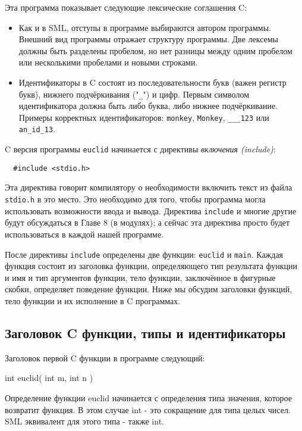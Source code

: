 Эта программа показывает следующие лексические соглашения C:

\begin{itemize}
\item{Как и в SML, отступы в программе выбираются автором программы. Внешний вид программы отражает структуру программы. Две лексемы должны быть разделены пробелом, но нет разницы между одним пробелом или несколькими пробелами и новыми строками.}

\item{\label{CIdentifiers}Идентификаторы в C состоят из последовательности букв (важен регистр букв), нижнего подчёркивания ("\lstinline|_|") и цифр. Первым символом идентификатора должна быть либо буква, либо нижнее подчёркивание. Примеры корректных идентификаторов: \lstinline|monkey|, \lstinline|Monkey|, \lstinline|___123| или \lstinline|an_id_13|.}
\end{itemize}

C версия программы \lstinline|euclid| начинается с директивы \emph{включения (include)}:

\begin{lstlisting}
  #include <stdio.h>
\end{lstlisting}

Эта директива говорит компилятору о необходимости включить текст из файла \lstinline|stdio.h| в это место. Это необходимо для того, чтобы программа могла использовать возможности ввода и вывода. Директива \lstinline|include| и многие другие будут обсуждаться в Главе 8 (в модулях); а сейчас эта директива просто будет использоваться в каждой нашей программе.

После директивы \lstinline|include| определены две функции: \lstinline|euclid| и \lstinline|main|. Каждая функция состоит из заголовка функции, определяющего тип результата функции и имя и тип аргументов функции, тело функции, заключённое в фигурные скобки, определяет поведение функции. Ниже мы обсудим заголовки функций, тело функции и их исполнение в C программах.

\subsection{Заголовок C функции, типы и идентификаторы}\label{HeaderCFunction}

Заголовок первой C функции в программе следующий:

int euclid( int m, int n )

Определение функции euclid начинается с определения типа значения, которое возвратит функция. В этом случае int - это сокращение для типа целых чисел. SML эквивалент для этого типа - также int.

